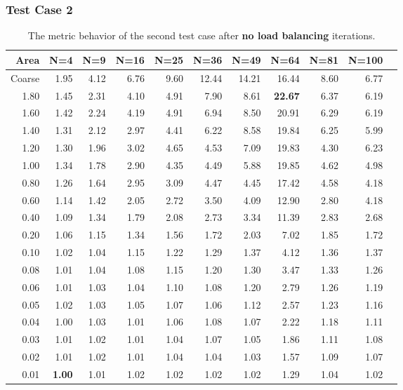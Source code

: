 \documentclass[]{beamer}
\begin{document}
\begin{frame}[t]\frametitle{Test Case 2}
\begin{table}[H]
\tiny
\centering
\caption{The metric behavior of the second test case after \textbf{no load balancing} iterations.} 
\begin{tabular}{rrrrrrrrrrr}
  \hline
 Area & N=4 & N=9 & N=16 & N=25 & N=36 & N=49 & N=64 & N=81 & N=100 \\ 
  \hline
 Coarse & 1.95 & 4.12 & 6.76 & 9.60 & 12.44 & 14.21 & 16.44 & 8.60 & 6.77 \\ 
1.80 & 1.45 & 2.31 & 4.10 & 4.91 & 7.90 & 8.61 & \textbf{\cellcolor{blue!25}22.67} & 6.37 & 6.19 \\ 
 1.60 & 1.42 & 2.24 & 4.19 & 4.91 & 6.94 & 8.50 & 20.91 & 6.29 & 6.19 \\ 
 1.40 & 1.31 & 2.12 & 2.97 & 4.41 & 6.22 & 8.58 & 19.84 & 6.25 & 5.99 \\ 
 1.20 & 1.30 & 1.96 & 3.02 & 4.65 & 4.53 & 7.09 & 19.83 & 4.30 & 6.23 \\ 
 1.00 & 1.34 & 1.78 & 2.90 & 4.35 & 4.49 & 5.88 & 19.85 & 4.62 & 4.98 \\ 
 0.80 & 1.26 & 1.64 & 2.95 & 3.09 & 4.47 & 4.45 & 17.42 & 4.58 & 4.18 \\ 
  0.60 & 1.14 & 1.42 & 2.05 & 2.72 & 3.50 & 4.09 & 12.90 & 2.80 & 4.18 \\ 
 0.40 & 1.09 & 1.34 & 1.79 & 2.08 & 2.73 & 3.34 & 11.39 & 2.83 & 2.68 \\ 
 0.20 & 1.06 & 1.15 & 1.34 & 1.56 & 1.72 & 2.03 & 7.02 & 1.85 & 1.72 \\ 
  0.10 & 1.02 & 1.04 & 1.15 & 1.22 & 1.29 & 1.37 & 4.12 & 1.36 & 1.37 \\ 
   0.08 & 1.01 & 1.04 & 1.08 & 1.15 & 1.20 & 1.30 & 3.47 & 1.33 & 1.26 \\ 
  0.06 & 1.01 & 1.03 & 1.04 & 1.10 & 1.08 & 1.20 & 2.79 & 1.26 & 1.19 \\ 
 0.05 & 1.02 & 1.03 & 1.05 & 1.07 & 1.06 & 1.12 & 2.57 & 1.23 & 1.16 \\ 
 0.04 & 1.00 & 1.03 & 1.01 & 1.06 & 1.08 & 1.07 & 2.22 & 1.18 & 1.11 \\ 
 0.03 & 1.01 & 1.02 & 1.01 & 1.04 & 1.07 & 1.05 & 1.86 & 1.11 & 1.08 \\ 
  0.02 & 1.01 & 1.02 & 1.01 & 1.04 & 1.04 & 1.03 & 1.57 & 1.09 & 1.07 \\ 
 0.01 & \textbf{\cellcolor{blue!25}1.00} & 1.01 & 1.02 & 1.02 & 1.02 & 1.02 & 1.29 & 1.04 & 1.02 \\ 
   \hline
\end{tabular}
\end{table}
\end{frame}
\end{document}
